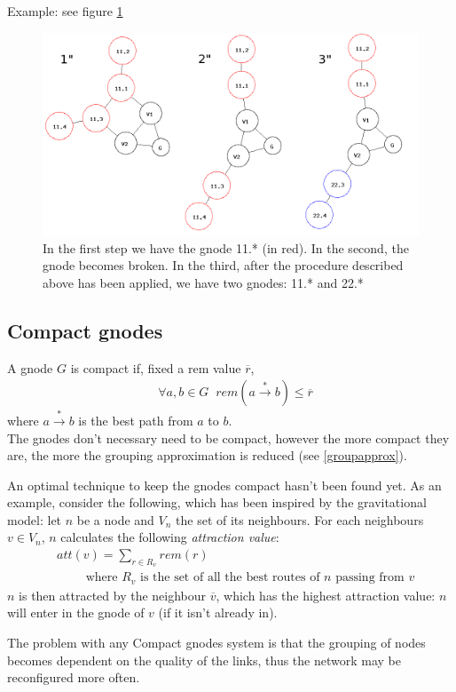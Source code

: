 \documentclass[a4paper]{article}
\newcommand{\T}[1]{\textrm{#1}}
\newcommand{\eal}[1]{{\begin{align*} #1 \end{align*}}}
\def\ove#1{{\overline{#1}}}
\newcommand{\qq}{\qquad}
\begin{document}
Example: see figure \ref{fig:congnode}
\begin{figure}[h]
	\begin{center}
		\includegraphics[scale=0.5]{fig/congnode}
	\end{center}
	\caption{In the first step we have the gnode 11.* (in red). In the
	second, the gnode becomes broken. In the third, after the procedure
	described above has been applied, we have two gnodes: 11.* and 22.*}
	\label{fig:congnode}
\end{figure}

\subsection{Compact gnodes}
A gnode $G$ is compact if, fixed a rem value $\ove r$, 
\eal{&\forall a,b\in G\;\;rem(a\stackrel{*}{\rightarrow} b)\le \ove r}
where $a\stackrel{*}{\rightarrow} b$ is the best path from $a$ to $b$.\\
The gnodes don't necessary need to be compact, however the more compact they
are, the more the grouping approximation is reduced (see \ref{groupapprox}).

An optimal technique to keep the gnodes compact hasn't been found yet. As an
example, consider the following, which has been inspired by the gravitational
model: let $n$ be a node and $V_n$ the set of its
neighbours. For each neighbours $v\in V_n$, $n$ calculates the following
\emph{attraction value}:
\eal{&att(v) = \sum_{r\in R_v} rem(r)\\
&\qq\T{ where $R_v$ is the set of all the best routes of $n$ passing from $v$}
}
$n$ is then attracted by the neighbour $\ove v$, which has the highest
attraction value: $n$ will enter in the gnode of $v$ (if it isn't already in).

The problem with any Compact gnodes system is that the grouping of nodes
becomes dependent on the quality of the links, thus the network may be
reconfigured more often.
\end{document}
